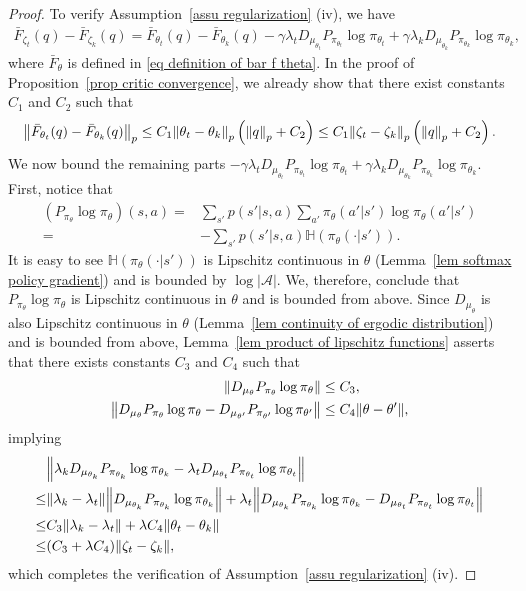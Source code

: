 \documentclass[twoside,11pt]{article}
\newcommand{\fA}{\mathcal{A}}
\newcommand{\na}{{|\fA|}}
\newcommand{\ent}[1]{\mathbb{H}\left(#1\right)}
\numberwithin{assucounter}{section}
\begin{document}
\begin{proof}
  To verify Assumption~\ref{assu regularization} (iv), 
  we have
  \begin{align}
    \bar F_{\zeta_t}(q) - \bar F_{\zeta_k}(q)
    = \bar F_{\theta_t}(q) - \bar F_{\theta_k}(q) - \gamma \lambda_t D_{\mu_{\theta_t}} P_{\pi_{\theta_t}} \log \pi_{\theta_t} + \gamma \lambda_k D_{\mu_{\theta_k}} P_{\pi_{\theta_k}} \log \pi_{\theta_k},
  \end{align}
  where $\bar F_\theta$ is defined in \eqref{eq definition of bar f theta}.
  In the proof of Proposition~\ref{prop critic convergence},
  we already show that
  there exist constants $C_1$ and $C_2$ such that
  \begin{align}
    \norm{\bar F_{\theta_t}(q) - \bar F_{\theta_k}(q)}_p \leq C_1 \norm{\theta_t - \theta_k}_p \left(\norm{q}_p + C_2\right) \leq C_1 \norm{\zeta_t - \zeta_k}_p \left(\norm{q}_p + C_2\right).
  \end{align}
  We now bound the remaining parts $- \gamma \lambda_t D_{\mu_{\theta_t}} P_{\pi_{\theta_t}} \log \pi_{\theta_t} + \gamma \lambda_k D_{\mu_{\theta_k}} P_{\pi_{\theta_k}} \log \pi_{\theta_k}$.
  First, notice that
  \begin{align}
    \left(P_{\pi_\theta} \log \pi_\theta\right)(s, a) =& \sum_{s'} p(s'|s, a) \sum_{a'} \pi_\theta(a'|s') \log \pi_\theta(a'|s') \\
    =& -\sum_{s'}p(s'|s,a)\ent{\pi_{\theta}(\cdot |s')}.
  \end{align}
  It is easy to see $\ent{\pi_\theta(\cdot|s')}$ is Lipschitz continuous in $\theta$ (Lemma~\ref{lem softmax policy gradient}) 
  and is bounded by $\log \na$.
  We, therefore, conclude that $P_{\pi_\theta} \log \pi_\theta$ is Lipschitz continuous in $\theta$ and is bounded from above.
  Since $D_{\mu_\theta}$ is also Lipschitz continuous in $\theta$ (Lemma~\ref{lem continuity of ergodic distribution}) and is bounded from above,
  Lemma~\ref{lem product of lipschitz functions} asserts that there exists constants $C_3$ and $C_4$ such that
  \begin{align}
    \norm{D_{\mu_\theta} P_{\pi_\theta} \log \pi_\theta} &\leq C_3, \\
    \norm{D_{\mu_\theta} P_{\pi_\theta} \log \pi_\theta - D_{\mu_{\theta'}} P_{\pi_{\theta'}} \log \pi_{\theta'}} &\leq C_4 \norm{\theta - \theta'},
  \end{align}
  implying
  \begin{align}
    &\norm{\lambda_k D_{\mu_{\theta_k}} P_{\pi_{\theta_k}} \log \pi_{\theta_k} - \lambda_t D_{\mu_{\theta_t}} P_{\pi_{\theta_t}} \log \pi_{\theta_t}} \\
    \leq & \norm{\lambda_k - \lambda_t} \norm{D_{\mu_{\theta_k}} P_{\pi_{\theta_k}} \log \pi_{\theta_k}} + \lambda_t \norm{D_{\mu_{\theta_k}} P_{\pi_{\theta_k}} \log \pi_{\theta_k} - D_{\mu_{\theta_t}} P_{\pi_{\theta_t}} \log \pi_{\theta_t}} \\
    \leq &C_3 \norm{\lambda_k - \lambda_t} + \lambda C_4 \norm{\theta_t - \theta_k} \\
    \leq &(C_3 + \lambda C_4) \norm{\zeta_t - \zeta_k},
  \end{align}
  which completes the verification of Assumption~\ref{assu regularization} (iv).


\end{proof}
\end{document}
